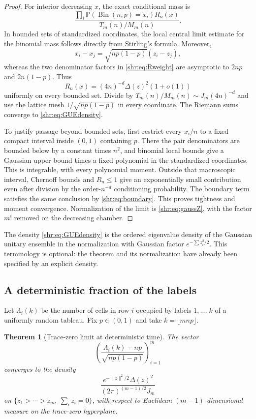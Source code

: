 \documentclass[11pt,letterpaper]{article}
\numberwithin{equation}{section}
\newtheorem{theorem}{Theorem}[section]
\theoremstyle{definition}
\newcommand{\Pp}{\mathbb P}
\newcommand{\1}{\mathbf 1}
\begin{document}
\begin{proof}
For interior decreasing $x$, the exact conditional mass is
\[
 \frac{\prod_i\Pp(\operatorname{Bin}(n,p)=x_i)R_n(x)}
      {T_m(n)/M_m(n)}.
\]
In bounded sets of standardized coordinates, the local central limit
estimate for the binomial mass follows directly from Stirling's formula.
Moreover,
\[
 x_i-x_j=\sqrt{np(1-p)}(z_i-z_j),
\]
whereas the two denominator factors in \eqref{shr:eq:Rweight} are asymptotic
to $2np$ and $2n(1-p)$. Thus
\[
 R_n(x)=(4n)^{-d}\Delta(z)^2(1+o(1))
\]
uniformly on every bounded set. Divide by
$T_m(n)/M_m(n)\sim J_m(4n)^{-d}$ and use the lattice mesh
$1/\sqrt{np(1-p)}$ in every coordinate. The Riemann sums converge to
\eqref{shr:eq:GUEdensity}.

To justify passage beyond bounded sets, first restrict every $x_i/n$ to a
fixed compact interval inside $(0,1)$ containing $p$. There the pair
denominators are bounded below by a constant times $n^2$, and binomial
local bounds give a Gaussian upper bound times a fixed polynomial in the
standardized coordinates. This is integrable, with every polynomial
moment. Outside that macroscopic interval, Chernoff bounds and $R_n\le1$
give an exponentially small contribution even after division by the
order-$n^{-d}$ conditioning probability. The boundary term satisfies the
same conclusion by \eqref{shr:eq:boundary}. This proves tightness and moment
convergence. Normalization of the limit is \eqref{shr:eq:gaussZ}, with the
factor $m!$ removed on the decreasing chamber.
\end{proof}

The density \eqref{shr:eq:GUEdensity} is the ordered eigenvalue density of the
Gaussian unitary ensemble in the normalization with Gaussian factor
$e^{-\sum z_i^2/2}$. This terminology is optional: the theorem and its
normalization have already been specified by an explicit density.

\subsection{A deterministic fraction of the labels}
Let $\Lambda_i(k)$ be the number of cells in row $i$ occupied by labels
$1,\ldots,k$ of a uniformly random tableau. Fix $p\in(0,1)$ and take
$k=\lfloor mnp\rfloor$.

\begin{theorem}[Trace-zero limit at deterministic time]\label{shr:thm:tracezero}
The vector
\[
 \left(\frac{\Lambda_i(k)-np}{\sqrt{np(1-p)}}\right)_{i=1}^m
\]
converges to the density
\begin{equation}
 \frac{e^{-\|z\|^2/2}\Delta(z)^2}{(2\pi)^{(m-1)/2}J_m}
 \label{shr:eq:tracezerodensity}
\end{equation}
on $\{z_1>\cdots>z_m,\ \sum_i z_i=0\}$, with respect to Euclidean
$(m-1)$-dimensional measure on the trace-zero hyperplane.
\end{theorem}
\end{document}
